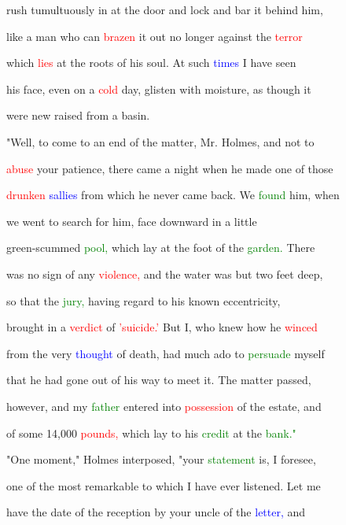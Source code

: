  rush tumultuously in at the door and lock and bar it behind him,

 like a man who can \textcolor{red}{brazen} it out no longer against the \textcolor{red}{terror}

 which \textcolor{red}{lies} at the roots of his soul. At such \textcolor{blue}{times} I have seen

 his face, even on a \textcolor{red}{cold} day, glisten with moisture, as though it

 were new raised from a basin.



 "Well, to come to an end of the matter, Mr. Holmes, and not to

 \textcolor{red}{abuse} your \textcolor{BurntOrange}{patience,} there came a night when he made one of those

 \textcolor{red}{drunken} \textcolor{blue}{sallies} from which he never came back. We \textcolor{green}{found} him, when

 we went to search for him, face downward in a little

 green-scummed \textcolor{green}{pool,} which lay at the foot of the \textcolor{green}{garden.} There

 was no sign of any \textcolor{red}{violence,} and the water was but two feet deep,

 so that the \textcolor{green}{jury,} having regard to his known eccentricity,

 brought in a \textcolor{red}{verdict} of \textcolor{red}{'suicide.'} But I, who knew how he \textcolor{red}{winced}

 from the very \textcolor{blue}{thought} of \textcolor{BurntOrange}{death,} had much ado to \textcolor{green}{persuade} myself

 that he had gone out of his way to meet it. The matter passed,

 however, and my \textcolor{green}{father} entered into \textcolor{red}{possession} of the estate, and

 of some 14,000 \textcolor{red}{pounds,} which lay to his \textcolor{green}{credit} at the \textcolor{green}{bank."}



 "One moment," Holmes interposed, "your \textcolor{green}{statement} is, I \textcolor{BurntOrange}{foresee,}

 one of the most \textcolor{BurntOrange}{remarkable} to which I have ever listened. Let me

 have the date of the reception by your uncle of the \textcolor{blue}{letter,} and


